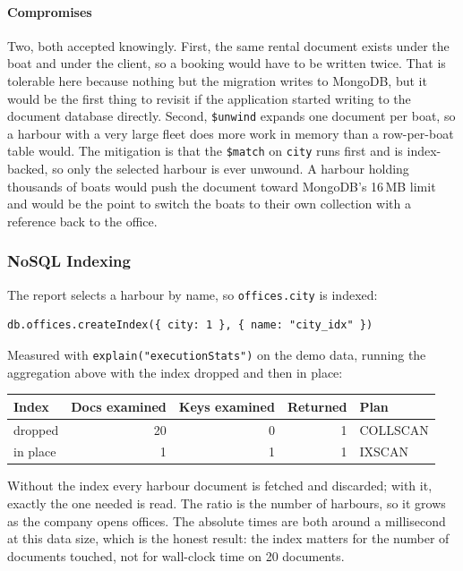 \documentclass[a4paper, 11pt]{article}          %
\begin{document}
\paragraph{Compromises} Two, both accepted knowingly. First, the same rental
document exists under the boat and under the client, so a booking would have to
be written twice. That is tolerable here because nothing but the migration
writes to MongoDB, but it would be the first thing to revisit if the application
started writing to the document database directly. Second, \texttt{\$unwind}
expands one document per boat, so a harbour with a very large fleet does more
work in memory than a row-per-boat table would. The mitigation is that the
\texttt{\$match} on \texttt{city} runs first and is index-backed, so only the
selected harbour is ever unwound. A harbour holding thousands of boats would
push the document toward MongoDB's 16\,MB limit and would be the point to switch
the boats to their own collection with a reference back to the office.

\subsubsection{NoSQL Indexing}

The report selects a harbour by name, so \texttt{offices.city} is indexed:

\begin{lstlisting}
db.offices.createIndex({ city: 1 }, { name: "city_idx" })
\end{lstlisting}

Measured with \texttt{explain("executionStats")} on the demo data, running the
aggregation above with the index dropped and then in place:

\begin{center}
\begin{tabular}{lrrrl}
\toprule
Index & Docs examined & Keys examined & Returned & Plan \\
\midrule
dropped  & 20 & 0 & 1 & COLLSCAN \\
in place & 1  & 1 & 1 & IXSCAN \\
\bottomrule
\end{tabular}
\end{center}

Without the index every harbour document is fetched and discarded; with it,
exactly the one needed is read. The ratio is the number of harbours, so it grows
as the company opens offices. The absolute times are both around a millisecond
at this data size, which is the honest result: the index matters for the number
of documents touched, not for wall-clock time on 20 documents.
\end{document}
